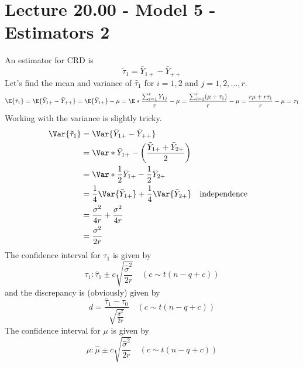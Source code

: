 \section{Lecture 20.00 - Model 5 - Estimators 2}
An estimator for CRD is
\[ \tilde{\tau}_1=\bar{Y}_{1+}-\bar{Y}_{++} \]
Let's find the mean and variance of $ \tilde{\tau_1} $ for $ i=1,2 $ and
$ j=1,2,\ldots,r $.
\[ \E{\tilde{\tau}_1}
    =\E{\bar{Y}_{1+}-\bar{Y}_{++}}
    =\E{\bar{Y}_{1+}}-\mu
    =\E*{\frac{\sum_{i=1}^{r} Y_{1j}}{r}}-\mu
    =\frac{\sum_{i=1}^{r} (\mu+\tau_1)}{r} -\mu
    =\frac{r\mu+r\tau_1}{r} -\mu
    =\tau_1 \]
Working with the variance is slightly tricky.
\begin{align*}
    \Var{\tilde{\tau}_1}
     & =\Var{\bar{Y}_{1+}-\bar{Y}_{++}}                                                                 \\
     & =\Var*{\bar{Y}_{1+}-\biggl(\frac{\bar{Y}_{1+}+\bar{Y}_{2+}}{2} \biggr)}                          \\
     & =\Var*{\frac{1}{2} \bar{Y}_{1+}-\frac{1}{2} \bar{Y}_{2+}}                                        \\
     & =\frac{1}{4}\Var{\bar{Y}_{1+}}+\frac{1}{4} \Var{\bar{Y}_{2+}}           &  & \text{independence} \\
     & =\frac{\sigma^2}{4r}+\frac{\sigma^2}{4r}                                                         \\
     & =\frac{\sigma^2}{2r}
\end{align*}
The confidence interval for $ \tau_1 $ is given by
\[ \tau_1:\hat{\tau}_1\pm c\sqrt{\frac{\hat{\sigma}^2}{2r}}\quad(c\sim t(n-q+c)) \]
and the discrepancy is (obviously) given by
\[ d=\frac{\hat{\tau}_1-\tau_0}{\displaystyle \sqrt{\frac{\hat{\sigma}^2}{2r}}}\quad(c\sim t(n-q+c))  \]
The confidence interval for $ \mu $ is given by
\[ \mu:\hat{\mu}\pm c\sqrt{\frac{\hat{\sigma}^2}{2r}}\quad(c\sim t(n-q+c)) \]
